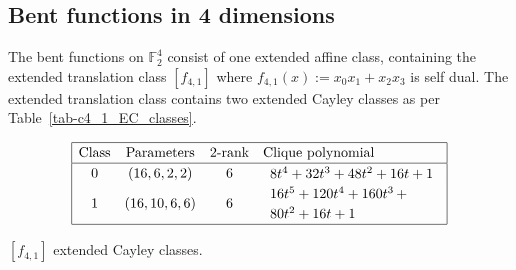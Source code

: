 \documentclass[12pt,a4paper]{article}
\newcommand{\mb}[1]{\mathbb{#1}}
\newcommand{\F}{\mb{F}}
\begin{document}
\subsection{Bent functions in 4 dimensions}
%
The bent functions on $\F_2^4$ consist of one extended affine class, containing the extended translation class $[f_{4,1}]$ where
$f_{4,1}(x) := x_0 x_1 + x_2 x_3$ is self dual.
The extended translation class contains two extended Cayley classes as per Table~\ref{tab-c4_1_EC_classes}.
\begin{table}[!bhpt] %
\small{
\begin{align*}
\def\arraystretch{1.2}
\begin{array}{|cccl|}
\hline
\text{Class} &
\text{Parameters} &
\text{2-rank} &
\text{Clique polynomial}
\\
\hline
0 &
(16, 6, 2, 2) &
6 &
\begin{array}{l}
8t^{4} + 32t^{3} + 48t^{2} + 16t + 1
\end{array}
\\
1 &
(16, 10, 6, 6) &
6 &
\begin{array}{l}
16t^{5} + 120t^{4} + 160t^{3}
\,+
\\
 80t^{2} + 16t + 1
\end{array}
\\
\hline
\end{array}
\end{align*}
}
\caption{$[f_{4,1}]$ extended Cayley classes.}
\label{tab-c4_1_EC_classes}
\end{table}

%
\end{document}
